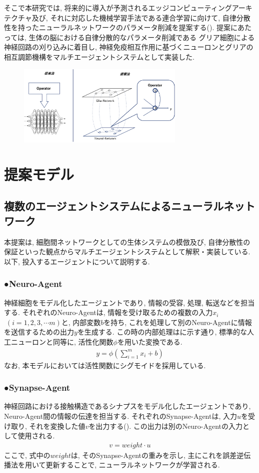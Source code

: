 \documentclass[a4paper,9pt,twocolumn]{jsarticle}
\begin{document}
そこで本研究では, 将来的に導入が予測されるエッジコンピューティングアーキテクチャ及び, 
それに対応した機械学習手法である連合学習に向けて, 
自律分散性を持ったニューラルネットワークのパラメータ削減を提案する().
提案にあたっては, 生体の脳における自律分散的なパラメータ削減である
グリア細胞による神経回路の刈り込みに着目し, 
神経免疫相互作用に基づくニューロンとグリアの相互調節機構をマルチエージェントシステムとして実装した.
\begin{figure}[H]
  \centering
  \includegraphics[width=8cm]{ThisModel.pdf}
  \label{fig:ThisModel}
\end{figure}
\vspace{-4zh}
\section{提案モデル}
\subsection{複数のエージェントシステムによるニューラルネットワーク}
本提案は, 細胞間ネットワークとしての生体システムの模倣及び, 
自律分散性の保証といった観点からマルチエージェントシステムとして解釈・実装している.  
以下, 投入するエージェントについて説明する.
  \subsubsection*{●Neuro-Agent}
  神経細胞をモデル化したエージェントであり, 情報の受容, 処理, 
  転送などを担当する.
  それぞれのNeuro-Agentは, 情報を受け取るための複数の入力$x_i$ $\;(i= 1, 2, 3, \cdots m)$と, 
  内部変数$b$を持ち, 
  これを処理して別のNeuro-Agentに情報を送信するための出力$y$を生成する.
  この時の内部処理はに示す通り, 
  標準的な人工ニューロンと同等に, 活性化関数$\phi$を用いた変換である.
  \begin{align}
    y=\phi(\sum_{i=1}^m x_i+b)
    \label{eq:Neuro-Agent}
  \end{align}
  なお, 本モデルにおいては活性関数にシグモイドを採用している.
  \subsubsection*{●Synapse-Agent}
  神経回路における接触構造であるシナプスをモデル化したエージェントであり, 
  Neuro-Agent間の情報の伝達を担当する.
  それぞれのSynapse-Agentは, 入力$u$を受け取り, それを変換した値$v$を出力する(). 
  この出力は別のNeuro-Agentの入力として使用される.
  \begin{align}
    v=weight\cdot u
 \label{eq:Synapse-Agent}   
  \end{align}
  ここで, 式中の$weight$は, そのSynapse-Agentの重みを示し, 
  主にこれを誤差逆伝播法を用いて更新することで, ニューラルネットワークが学習される.
\end{document}

